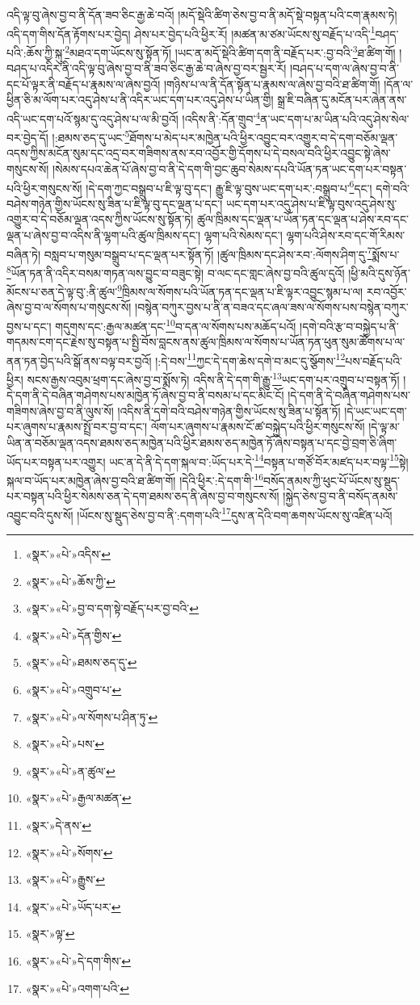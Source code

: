 འདི་ལྟ་བུ་ཞེས་བྱ་བ་ནི་དོན་ཟབ་ཅིང་རྒྱ་ཆེ་བའོ། །མདོ་སྡེའི་ཚིག་ཅེས་བྱ་བ་ནི་མདོ་སྡེ་བསྟན་པའི་ངག་རྣམས་ཏེ། འདི་དག་གིས་དོན་རྟོགས་པར་བྱེད། ཤེས་པར་བྱེད་པའི་ཕྱིར་རོ། །མཚན་མ་ཙམ་ཡོངས་སུ་བརྗོད་པ་འདི་\footnote{«སྣར་»«པེ་»འདིས་}བཤད་པའི་:ཆོས་ཀྱི་སྐུ་\footnote{«སྣར་»«པེ་»ཆོས་ཀྱི་}མཐའ་དག་ཡོངས་སུ་སྟོན་ཏོ། །ཡང་ན་མདོ་སྡེའི་ཚིག་དག་ནི་བརྗོད་པར་:བྱ་བའི་\footnote{«སྣར་»«པེ་»བྱ་བ་དག་སྟེ་བརྗོད་པར་བྱ་བའི་}ཐ་ཚིག་གོ། །བཤད་པ་འདིར་ནི་འདི་ལྟ་བུ་ཞེས་བྱ་བ་ནི་ཟབ་ཅིང་རྒྱ་ཆེ་བ་ཞེས་བྱ་བར་སྦྱར་རོ། །བཤད་པ་དག་ལ་ཞེས་བྱ་བ་ནི་དང་པོ་ལྟར་ནི་བརྗོད་པ་རྣམས་ལ་ཞེས་བྱའོ། །གཉིས་པ་ལ་ནི་དོན་སྟོན་པ་རྣམས་ལ་ཞེས་བྱ་བའི་ཐ་ཚིག་གོ། །དོན་ལ་ཕྱིན་ཅི་མ་ལོག་པར་འདུ་ཤེས་པ་ནི་འདིར་ཡང་དག་པར་འདུ་ཤེས་པ་ཡིན་གྱི། སྒྲ་ཇི་བཞིན་དུ་མངོན་པར་ཞེན་ནས་འདི་ཡང་དག་པའོ་སྙམ་དུ་འདུ་ཤེས་པ་ལ་མི་བྱའོ། །འདིས་ནི་:དོན་གྲུབ་\footnote{«སྣར་»«པེ་»དོན་གྱིས་}ན་ཡང་དག་པ་མ་ཡིན་པའི་འདུ་ཤེས་སེལ་བར་བྱེད་དོ། །:ཐམས་ཅད་དུ་ཡང་\footnote{«སྣར་»«པེ་»ཐམས་ཅད་དུ་}ཐོགས་པ་མེད་པར་མཁྱེན་པའི་ཕྱིར་འབྱུང་བར་འགྱུར་བ་དེ་དག་བཅོམ་ལྡན་འདས་ཀྱིས་མངོན་སུམ་དང་འདྲ་བར་གཟིགས་ནས་རབ་འབྱོར་གྱི་དོགས་པ་དེ་བསལ་བའི་ཕྱིར་འབྱུང་སྟེ་ཞེས་གསུངས་སོ། །སེམས་དཔའ་ཆེན་པོ་ཞེས་བྱ་བ་ནི་དེ་དག་གི་བྱང་ཆུབ་སེམས་དཔའི་ཡོན་ཏན་ཡང་དག་པར་བསྟན་པའི་ཕྱིར་གསུངས་སོ། །དེ་དག་ཀྱང་བསྒྲུབ་པ་ཇི་ལྟ་བུ་དང་། རྒྱུ་ཇི་ལྟ་བུས་ཡང་དག་པར་:བསྒྲུབ་པ་\footnote{«སྣར་»«པེ་»འགྲུབ་པ་}དང་། དགེ་བའི་བཤེས་གཉེན་གྱིས་ཡོངས་སུ་ཟིན་པ་ཇི་ལྟ་བུ་དང་ལྡན་པ་དང་། ཡང་དག་པར་འདུ་ཤེས་པ་ཇི་ལྟ་བུས་འདུ་ཤེས་སུ་འགྱུར་བ་དེ་བཅོམ་ལྡན་འདས་ཀྱིས་ཡོངས་སུ་སྟོན་ཏེ། ཚུལ་ཁྲིམས་དང་ལྡན་པ་ཡོན་ཏན་དང་ལྡན་པ་ཤེས་རབ་དང་ལྡན་པ་ཞེས་བྱ་བ་འདིས་ནི་ལྷག་པའི་ཚུལ་ཁྲིམས་དང་། ལྷག་པའི་སེམས་དང་། ལྷག་པའི་ཤེས་རབ་དང་གོ་རིམས་བཞིན་ཏེ། བསླབ་པ་གསུམ་བསྒྲུབ་པ་དང་ལྡན་པར་སྟོན་ཏོ། །ཚུལ་ཁྲིམས་དང་ཤེས་རབ་:ལོགས་ཤིག་དུ་\footnote{«སྣར་»«པེ་»ལ་སོགས་པ་ཤིན་ཏུ་}སྨོས་པ་\footnote{«སྣར་»«པེ་»པས་}ཡོན་ཏན་ནི་འདིར་བསམ་གཏན་ལས་བྱུང་བ་བཟུང་སྟེ། བ་ལང་དང་གླང་ཞེས་བྱ་བའི་ཚུལ་དུའོ། །ཕྱི་མའི་དུས་ཉོན་མོངས་པ་ཅན་དེ་ལྟ་བུ་:ནི་ཚུལ་\footnote{«སྣར་»«པེ་»ན་ཚུལ་}ཁྲིམས་ལ་སོགས་པའི་ཡོན་ཏན་དང་ལྡན་པ་ཇི་ལྟར་འབྱུང་སྙམ་པ་ལ། རབ་འབྱོར་ཞེས་བྱ་བ་ལ་སོགས་པ་གསུངས་སོ། །བསྙེན་བཀུར་བྱས་པ་ནི་ན་བཟའ་དང་ཞལ་ཟས་ལ་སོགས་པས་བསྙེན་བཀུར་བྱས་པ་དང་། གདུགས་དང་:རྒྱལ་མཚན་དང་\footnote{«སྣར་»«པེ་»རྒྱལ་མཚན་}བ་དན་ལ་སོགས་པས་མཆོད་པའོ། །དགེ་བའི་རྩ་བ་བསྐྱེད་པ་ནི་གདམས་ངག་དང་རྗེས་སུ་བསྟན་པ་སྤྱི་བོས་བླངས་ནས་ཚུལ་ཁྲིམས་ལ་སོགས་པ་ཡོན་ཏན་ཕུན་སུམ་ཚོགས་པ་ལ་ནན་ཏན་བྱེད་པའི་སྒོ་ནས་བལྟ་བར་བྱའོ། །:དེ་བས་\footnote{«སྣར་»དེ་ནས་}ཀྱང་དེ་དག་ཆེས་དགེ་བ་མང་དུ་སྩོགས་\footnote{«སྣར་»«པེ་»སོགས་}པས་བརྗོད་པའི་ཕྱིར། སངས་རྒྱས་འབུམ་ཕྲག་དང་ཞེས་བྱ་བ་སྨོས་ཏེ། འདིས་ནི་དེ་དག་གི་རྒྱུ་\footnote{«སྣར་»«པེ་»རྒྱུས་}ཡང་དག་པར་འགྲུབ་པ་བསྟན་ཏོ། །དེ་དག་ནི་དེ་བཞིན་གཤེགས་པས་མཁྱེན་ཏོ་ཞེས་བྱ་བ་ནི་བསམ་པ་དང་མིང་ངོ། །དེ་དག་ནི་དེ་བཞིན་གཤེགས་པས་གཟིགས་ཞེས་བྱ་བ་ནི་ལུས་སོ། །འདིས་ནི་དགེ་བའི་བཤེས་གཉེན་གྱིས་ཡོངས་སུ་ཟིན་པ་སྟོན་ཏོ། །དེ་ཡང་ཡང་དག་པར་ཞུགས་པ་རྣམས་སྤྲོ་བར་བྱ་བ་དང་། ལོག་པར་ཞུགས་པ་རྣམས་ངོ་ཚ་བསྐྱེད་པའི་ཕྱིར་གསུངས་སོ། །དེ་ལྟ་མ་ཡིན་ན་བཅོམ་ལྡན་འདས་ཐམས་ཅད་མཁྱེན་པའི་ཕྱིར་ཐམས་ཅད་མཁྱེན་ཏོ་ཞེས་བསྟན་པ་དང་བྱེ་བྲག་ཅི་ཞིག་ཡོད་པར་བསྟན་པར་འགྱུར། ཡང་ན་དེ་ནི་དེ་དག་སྐལ་བ་:ཡོད་པར་དེ་\footnote{«སྣར་»«པེ་»ཡོད་པར་}བསྟན་པ་གཙོ་བོར་མཛད་པར་བལྟ་\footnote{«སྣར་»ལྟ་}སྟེ། སྐལ་བ་ཡོད་པར་མཁྱེན་ཞེས་བྱ་བའི་ཐ་ཚིག་གོ། །དེའི་ཕྱིར་:དེ་དག་གི་\footnote{«སྣར་»«པེ་»དེ་དག་གིས་}བསོད་ནམས་ཀྱི་ཕུང་པོ་ཡོངས་སུ་སྡུད་པར་བསྟན་པའི་ཕྱིར་སེམས་ཅན་དེ་དག་ཐམས་ཅད་ནི་ཞེས་བྱ་བ་གསུངས་སོ། །སྐྱེད་ཅེས་བྱ་བ་ནི་བསོད་ནམས་འབྱུང་བའི་དུས་སོ། །ཡོངས་སུ་སྡུད་ཅེས་བྱ་བ་ནི་:དགག་པའི་\footnote{«སྣར་»«པེ་»འགག་པའི་}དུས་ན་དེའི་བག་ཆགས་ཡོངས་སུ་འཛིན་པའོ། 